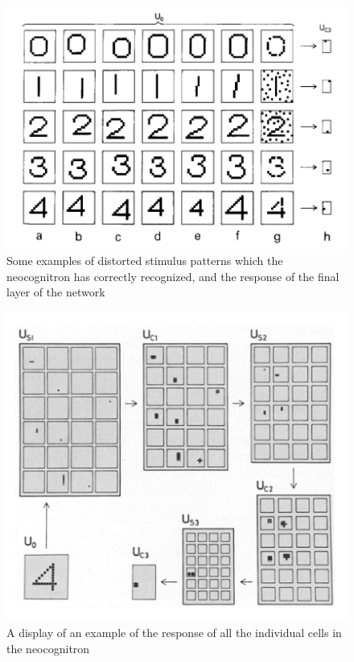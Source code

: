 \documentclass[12pt, letterpaper]{article}
\begin{document}
\begin{figure}[H]
    \includegraphics[width=\linewidth]{img/fig5.png}
    \caption{Some examples of distorted  stimulus patterns  which the neocognitron has correctly recognized, and the response of the final layer of the network }
    \label{fig:L5}
\end{figure}
\begin{figure}[H]
    \includegraphics[width=\linewidth]{img/fig6.png}
    \caption{A display of an  example of the response of all the individual cells in the neocognitron}
    \label{fig:L6}
\end{figure}
\end{document}
